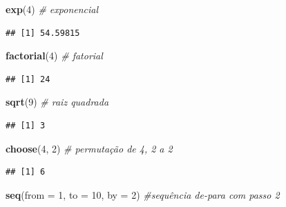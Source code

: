 \documentclass[
]{article}
\newenvironment{Shaded}{\begin{snugshade}}{\end{snugshade}}
\newcommand{\CommentTok}[1]{\textcolor[rgb]{0.56,0.35,0.01}{\textit{#1}}}
\newcommand{\DataTypeTok}[1]{\textcolor[rgb]{0.13,0.29,0.53}{#1}}
\newcommand{\DecValTok}[1]{\textcolor[rgb]{0.00,0.00,0.81}{#1}}
\newcommand{\KeywordTok}[1]{\textcolor[rgb]{0.13,0.29,0.53}{\textbf{#1}}}
\newcommand{\NormalTok}[1]{#1}
\begin{document}
\begin{Shaded}
\begin{Highlighting}[]
\KeywordTok{exp}\NormalTok{(}\DecValTok{4}\NormalTok{) }\CommentTok{# exponencial}
\end{Highlighting}
\end{Shaded}

\begin{verbatim}
## [1] 54.59815
\end{verbatim}

\begin{Shaded}
\begin{Highlighting}[]
\KeywordTok{factorial}\NormalTok{(}\DecValTok{4}\NormalTok{) }\CommentTok{# fatorial}
\end{Highlighting}
\end{Shaded}

\begin{verbatim}
## [1] 24
\end{verbatim}

\begin{Shaded}
\begin{Highlighting}[]
\KeywordTok{sqrt}\NormalTok{(}\DecValTok{9}\NormalTok{) }\CommentTok{# raiz quadrada}
\end{Highlighting}
\end{Shaded}

\begin{verbatim}
## [1] 3
\end{verbatim}

\begin{Shaded}
\begin{Highlighting}[]
\KeywordTok{choose}\NormalTok{(}\DecValTok{4}\NormalTok{, }\DecValTok{2}\NormalTok{) }\CommentTok{# permutação de 4, 2 a 2}
\end{Highlighting}
\end{Shaded}

\begin{verbatim}
## [1] 6
\end{verbatim}

\begin{Shaded}
\begin{Highlighting}[]
\KeywordTok{seq}\NormalTok{(}\DataTypeTok{from =} \DecValTok{1}\NormalTok{,}
    \DataTypeTok{to =} \DecValTok{10}\NormalTok{, }
    \DataTypeTok{by =} \DecValTok{2}\NormalTok{) }\CommentTok{#sequência de-para com passo 2}
\end{Highlighting}
\end{Shaded}
\end{document}
